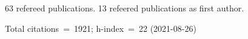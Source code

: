 63 refereed publications. 13 refeered publications as first author.

Total citations~=~1921; h-index~=~22 (2021-08-26)